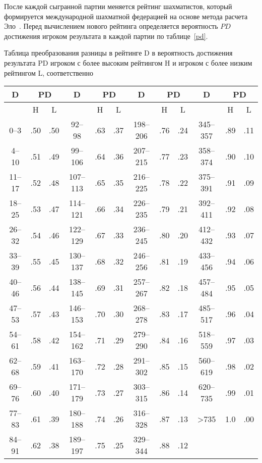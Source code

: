 После каждой сыгранной партии меняется рейтинг шахматистов, который формируется международной шахматной федерацией на основе метода расчета Эло~\cite{fideraiting, elo}. Перед вычислением нового рейтинга определяется вероятность $PD$ достижения игроком результата в каждой партии по таблице~\ref{pd}.
\begin{center}
	\begin{threeparttable}
		\captionsetup{justification=raggedright,singlelinecheck=off}
		\caption{\label{pd}Таблица преобразования разницы в рейтинге D в вероятность достижения
			результата PD игроком с более высоким рейтингом H и игроком с более низким
			рейтингом L, соответственно}
		\centering
		\begin{tabular}{|c|c|c|c|c|c|c|c|c|c|c|c|}
			\hline
			D & \multicolumn{2}{|c|}{PD} & D & \multicolumn{2}{|c|}{PD} & D & \multicolumn{2}{|c|}{PD} & D & \multicolumn{2}{|c|}{PD} \\
			\hline
			& H & L && H & L && H & L && H & L\\
			\hline
			0--3&.50&.50&92--98&.63&.37&198--206&.76&.24&345--357&.89&.11\\
			\hline
			4--10&.51&.49&99--106&.64&.36&207--215&.77&.23&358--374&.90&.10\\
			\hline
			11--17&.52&.48&107--113&.65&.35&216--225&.78&.22&375--391&.91&.09\\
			\hline
			18--25&.53&.47&114--121&.66&.34&226--235&.79&.21&392--411&.92&.08\\
			\hline
			26--32&.54&.46&122--129&.67&.33&236--245&.80&.20&412--432&.93&.07\\
			\hline
			33--39&.55&.45&130--137&.68&.32&246--256&.81&.19&433--456&.94&.06\\
			\hline
			40--46&.56&.44&138--145&.69&.31&257--267&.82&.18&457--484&.95&.05\\
			\hline
			47--53&.57&.43&146--153&.70&.30&268--278&.83&.17&485--517&.96&.04\\
			\hline
			54--61&.58&.42&154--162&.71&.29&279--290&.84&.16&518--559&.97&.03\\
			\hline
			62--68&.59&.41&163--170&.72&.28&291--302&.85&.15&560--619&.98&.02\\
			\hline
			69--76&.60&.40&171--179&.73&.27&303--315&.86&.14&620--735&.99&.01\\
			\hline
			77--83&.61&.39&180--188&.74&.26&316--328&.87&.13&>735&1.0&.00\\
			\hline
			84--91&.62&.38&189--197&.75&.25&329--344&.88&.12&&&\\
			\hline
		\end{tabular}
	\end{threeparttable}
\end{center}

